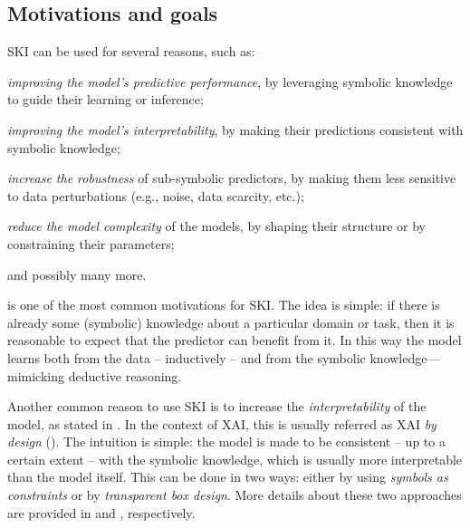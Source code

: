 \subsection{Motivations and goals}\label{subsec:ski-motivations-and-goals}
%
\Gls{SKI} can be used for several reasons, such as:
%
\begin{inlinelist}
    \item \label{itm:prediction}\emph{improving the model's predictive performance}, by leveraging symbolic knowledge to guide their learning or inference;
    \item \label{itm:interpretability}\emph{improving the model's interpretability}, by making their predictions consistent with symbolic knowledge;
    \item \label{itm:robustness}\emph{increase the robustness} of sub-symbolic predictors, by making them less sensitive to data perturbations (e.g., noise, data scarcity, etc.);
    \item \label{itm:complexity}\emph{reduce the model complexity} of the models, by shaping their structure or by constraining their parameters;
    \item and possibly many more.
\end{inlinelist}


 is one of the most common motivations for \gls{SKI}.
%
The idea is simple: if there is already some (symbolic) knowledge about a particular domain or task, then it is reasonable to expect that the predictor can benefit from it.
%
In this way the model learns both from the data -- inductively -- and from the symbolic knowledge---mimicking deductive reasoning.


Another common reason to use \gls{SKI} is to increase the \emph{interpretability} of the model, as stated in .
%
In the context of \gls{XAI}, this is usually referred as \gls{XAI} \emph{by design} ().
%
The intuition is simple: the model is made to be consistent -- up to a certain extent -- with the symbolic knowledge, which is usually more interpretable than the model itself.
%
This can be done in two ways: either by using \emph{symbols as constraints} or by \emph{transparent box design}.
%
More details about these two approaches are provided in  and , respectively.


